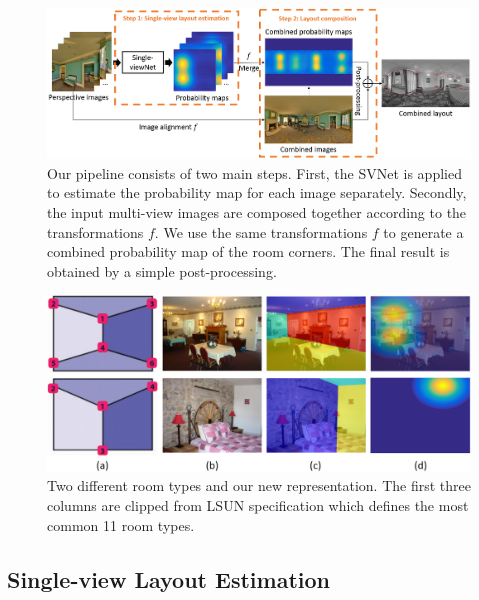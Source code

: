  

\begin{figure}[ht]
	\centering
	\includegraphics[width=\linewidth]{figs/ppline.png}
	\caption{Our pipeline consists of two main steps. First, the SVNet is applied to estimate the probability map for each image separately. Secondly, the input multi-view images are composed together according to the   transformations $f$. We use the same transformations $f$ to generate a combined probability map of the room corners. The final result is obtained by a simple post-processing. }
	\label{fig:overview}
\end{figure}

\begin{figure}
	\centering
	\includegraphics[width=\linewidth]{figs/representation.png}
	\caption{Two different room types and our new representation. The first three columns are clipped from LSUN specification \cite{zhang2015large} which defines the most common 11 room types. }
	\label{fig:representation}
\end{figure}

\subsection{Single-view Layout Estimation}
\label{sec:layout}

